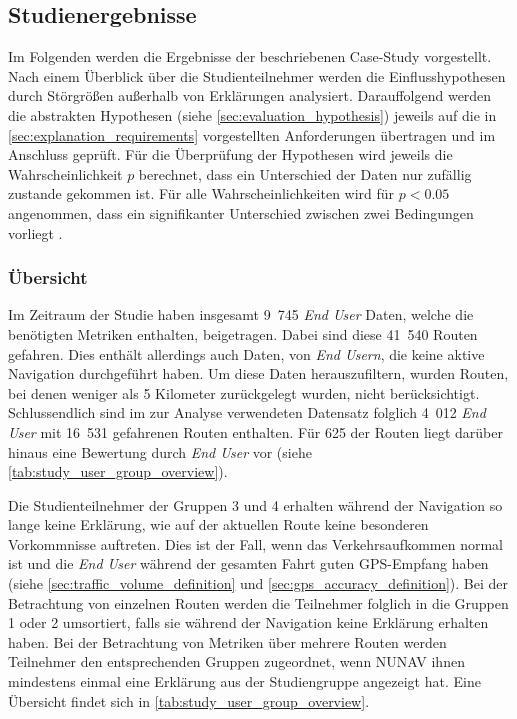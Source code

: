\subsection{Studienergebnisse}
\label{sec:study_results_quantitativ}

Im Folgenden werden die Ergebnisse der beschriebenen Case-Study vorgestellt. Nach einem Überblick über die Studienteilnehmer werden die Einflusshypothesen durch Störgrößen außerhalb von Erklärungen analysiert. Darauffolgend werden die abstrakten Hypothesen (siehe \autoref{sec:evaluation_hypothesis}) jeweils auf die in \autoref{sec:explanation_requirements} vorgestellten Anforderungen übertragen und im Anschluss geprüft. Für die Überprüfung der Hypothesen wird jeweils die Wahrscheinlichkeit $ p $ berechnet, dass ein Unterschied der Daten nur zufällig zustande gekommen ist. Für alle Wahrscheinlichkeiten wird für $ p < 0.05 $ angenommen, dass ein signifikanter Unterschied zwischen zwei Bedingungen vorliegt \cite[vgl.][]{wohlin2012experimentation}.

\subsubsection{Übersicht}

Im Zeitraum der Studie haben insgesamt 9~745 \textit{End User} Daten, welche die benötigten Metriken enthalten, beigetragen. Dabei sind diese 41~540 Routen gefahren. Dies enthält allerdings auch Daten, von \textit{End Usern}, die keine aktive Navigation durchgeführt haben. Um diese Daten herauszufiltern, wurden Routen, bei denen weniger als 5 Kilometer zurückgelegt wurden, nicht berücksichtigt. Schlussendlich sind im zur Analyse verwendeten Datensatz folglich 4~012 \textit{End User} mit 16~531 gefahrenen Routen enthalten. Für 625 der Routen liegt darüber hinaus eine Bewertung durch \textit{End User} vor (siehe \autoref{tab:study_user_group_overview}).

Die Studienteilnehmer der Gruppen 3 und 4 erhalten während der Navigation so lange keine Erklärung, wie auf der aktuellen Route keine besonderen Vorkommnisse auftreten. Dies ist der Fall, wenn das Verkehrsaufkommen \glqq normal\grqq{} ist und die \textit{End User} während der gesamten Fahrt guten GPS-Empfang haben (siehe \autoref{sec:traffic_volume_definition} und \autoref{sec:gps_accuracy_definition}). Bei der Betrachtung von einzelnen Routen werden die Teilnehmer folglich in die Gruppen 1 oder 2 umsortiert, falls sie während der Navigation keine Erklärung erhalten haben. Bei der Betrachtung von Metriken über mehrere Routen werden Teilnehmer den entsprechenden Gruppen zugeordnet, wenn NUNAV ihnen mindestens einmal eine Erklärung aus der Studiengruppe angezeigt hat. Eine Übersicht findet sich in \autoref{tab:study_user_group_overview}.

